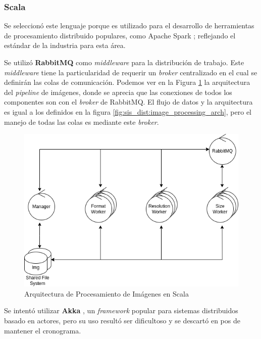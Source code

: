 \documentclass[11pt]{article}
\let\Oldsubsubsection\subsubsection
\renewcommand{\subsubsection}{\FloatBarrier\Oldsubsubsection}
\begin{document}
\subsubsection{Scala}

Se seleccionó este lenguaje porque es utilizado para el desarrollo de herramientas de procesamiento distribuido populares, como Apache Spark \cite{scala:ex:spark}; reflejando el estándar de la industria para esta área.

Se utilizó \textbf{RabbitMQ} \cite{scala:lib:rabbit} como \textit{middleware} para la distribución de trabajo. Este \textit{middleware} tiene la particularidad de requerir un \textit{broker} centralizado en el cual se definirán las colas de comunicación. Podemos ver en la Figura \ref{fig:scala:image_processing_arch} la arquitectura del \textit{pipeline} de imágenes, donde se aprecia que las conexiones de todos los componentes son con el \textit{broker} de RabbitMQ. El flujo de datos y la arquitectura es igual a los definidos en la figura \ref{fig:sis_dist:image_processing_arch}, pero el manejo de todas las colas es mediante este \textit{broker}.

\begin{figure}[ht]
    \centering
    \includegraphics[scale=0.4]{resources/distributed_systems/scala/image_processing_arch.png}
    \caption{Arquitectura de Procesamiento de Imágenes en Scala}
    \label{fig:scala:image_processing_arch}
\end{figure}

Se intentó utilizar \textbf{Akka} \cite{scala:lib:akka}, un \textit{framework} popular para sistemas distribuidos basado en actores, pero su uso resultó ser dificultoso y se descartó en pos de mantener el cronograma.
\end{document}
